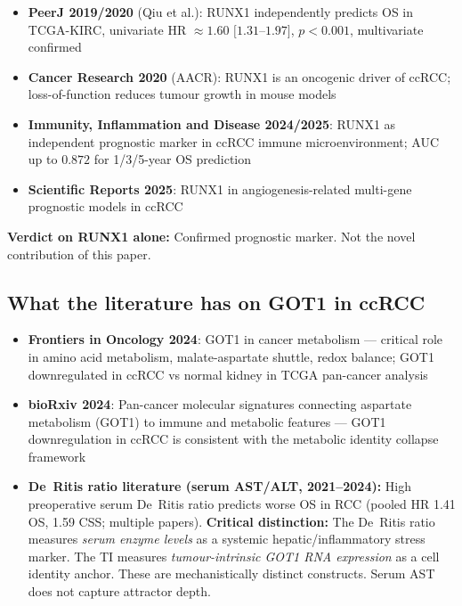 \documentclass[11pt, a4paper]{article}
\begin{document}
\begin{itemize}
    \item \textbf{PeerJ 2019/2020}
    (Qiu et al.): RUNX1 independently
    predicts OS in TCGA-KIRC,
    univariate HR $\approx 1.60$
    $[1.31$--$1.97]$, $p < 0.001$,
    multivariate confirmed
    \item \textbf{Cancer Research 2020}
    (AACR): RUNX1 is an oncogenic driver
    of ccRCC; loss-of-function reduces
    tumour growth in mouse models
    \item \textbf{Immunity, Inflammation
    and Disease 2024/2025}: RUNX1 as
    independent prognostic marker in ccRCC
    immune microenvironment; AUC up to
    $0.872$ for 1/3/5-year OS prediction
    \item \textbf{Scientific Reports 2025}:
    RUNX1 in angiogenesis-related
    multi-gene prognostic models in ccRCC
\end{itemize}

\textbf{Verdict on RUNX1 alone:}
Confirmed prognostic marker.
Not the novel contribution of this paper.

\subsection{What the literature has on
GOT1 in ccRCC}

\begin{itemize}
    \item \textbf{Frontiers in Oncology
    2024}: GOT1 in cancer metabolism ---
    critical role in amino acid metabolism,
    malate-aspartate shuttle, redox balance;
    GOT1 downregulated in ccRCC vs normal
    kidney in TCGA pan-cancer analysis
    \item \textbf{bioRxiv 2024}:
    Pan-cancer molecular signatures
    connecting aspartate metabolism (GOT1)
    to immune and metabolic features ---
    GOT1 downregulation in ccRCC is
    consistent with the metabolic identity
    collapse framework
    \item \textbf{De~Ritis ratio literature
    (serum AST/ALT, 2021--2024):}
    High preoperative serum De~Ritis ratio
    predicts worse OS in RCC (pooled
    HR 1.41 OS, 1.59 CSS; multiple papers).
    \textbf{Critical distinction:}
    The De~Ritis ratio measures
    \textit{serum enzyme levels} as a
    systemic hepatic/inflammatory stress
    marker. The TI measures
    \textit{tumour-intrinsic GOT1 RNA
    expression} as a cell identity anchor.
    These are mechanistically distinct
    constructs. Serum AST does not capture
    attractor depth.
\end{itemize}
\end{document}
